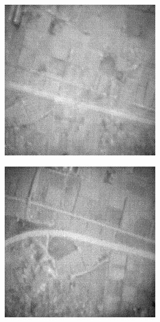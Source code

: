 \begin{figure}[H]
\begin{subfigure}[b]{0.24\textwidth}
    \end{subfigure}
    \hfill
    \begin{subfigure}[b]{0.24\textwidth}
        \centering
        \includegraphics[width=\textwidth]{../figs/outputs/petit/71.png}
    \end{subfigure}
    \hfill
    \begin{subfigure}[b]{0.24\textwidth}
        \centering
        \includegraphics[width=\textwidth]{../figs/outputs/mono/605.png}
    \end{subfigure}      
    

\end{figure}
